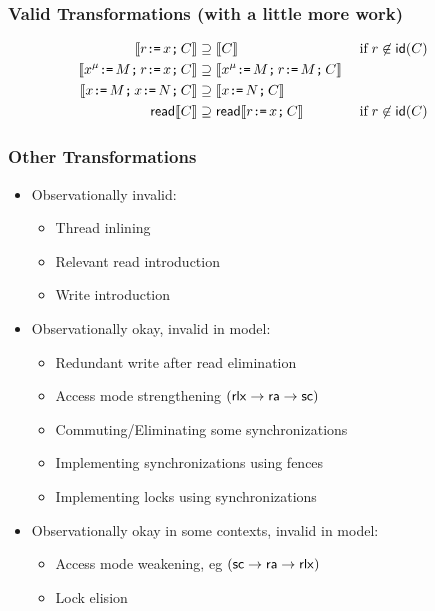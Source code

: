 \documentclass[t,aspectratio=169]{beamer} %
\begin{document}
\begin{frame}
  \frametitle{Valid Transformations (with a little more work)}
  \begin{align*}
    \llbracket r  \texttt{:}\mkern-1mu\texttt{=}\, x\texttt{;}\,\allowbreak C\rrbracket & \supseteq
    \llbracket C\rrbracket  
    &&\;\allowbreak\text{if}\allowbreak\; r\not\in\mathsf{id}(C)&&\hbox{}
    \\
    \llbracket x^\mu \texttt{:}\mkern-1mu\texttt{=}\, M \texttt{;}\,\allowbreak r  \texttt{:}\mkern-1mu\texttt{=}\, x\texttt{;}\,\allowbreak C\rrbracket &\supseteq 
    \llbracket x^\mu \texttt{:}\mkern-1mu\texttt{=}\, M \texttt{;}\,\allowbreak r  \texttt{:}\mkern-1mu\texttt{=}\, M\texttt{;}\,\allowbreak C\rrbracket  
    \\
    \llbracket x \texttt{:}\mkern-1mu\texttt{=}\, M \texttt{;}\,\allowbreak x  \texttt{:}\mkern-1mu\texttt{=}\, N\texttt{;}\,\allowbreak C\rrbracket &\supseteq 
    \llbracket x \texttt{:}\mkern-1mu\texttt{=}\, N\texttt{;}\,\allowbreak C\rrbracket    
    \\
    {\mathsf{read}}\llbracket C\rrbracket & \supseteq
    {\mathsf{read}}\llbracket r  \texttt{:}\mkern-1mu\texttt{=}\, x\texttt{;}\,\allowbreak C\rrbracket  
    &&\;\allowbreak\text{if}\allowbreak\; r\not\in\mathsf{id}(C)&&\hbox{}  
  \end{align*}
\end{frame}

\begin{frame}
  \frametitle{Other Transformations}
  \begin{itemize}
  \item<1-> Observationally invalid:
    \begin{itemize}
    \item Thread inlining
    \item Relevant read introduction
    \item Write introduction    
    \end{itemize}
  \item<2-> Observationally okay, invalid in model:
    \begin{itemize}      
    \item Redundant write after read elimination
    \item Access mode strengthening $({\mathsf{rlx}}\rightarrow{\mathsf{ra}} \rightarrow{\mathsf{sc}})$
    \item Commuting/Eliminating some synchronizations
    \item Implementing synchronizations using fences
    \item Implementing locks using synchronizations
    \end{itemize}
  \item<3-> Observationally okay in some contexts, invalid in model:
    \begin{itemize}      
    \item Access mode weakening, eg $({\mathsf{sc}}\rightarrow {\mathsf{ra}}\rightarrow{\mathsf{rlx}})$
    \item Lock elision
    \end{itemize}
  \end{itemize}
\end{frame}
\end{document}
